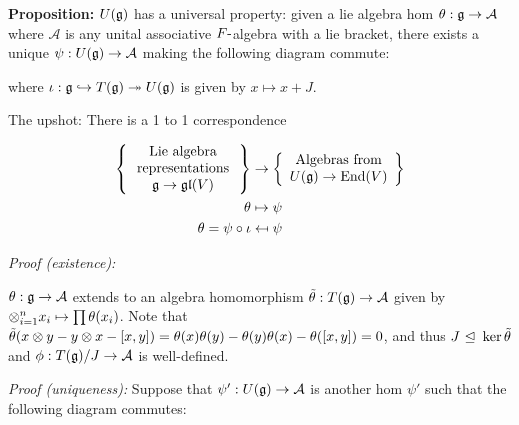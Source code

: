 \textbf{Proposition:} \(U({\mathfrak{g}})\) has a universal property: given a lie
algebra hom \(\theta: {\mathfrak{g}} \to \mathcal A\) where \(\mathcal A\) is any
unital associative \(F{\hbox{-}}\)algebra with a lie bracket, there exists a
unique \(\psi:U({\mathfrak{g}}) \to \mathcal A\) making the following diagram
commute:

\begin{center}
\end{center}

where \(\iota: {\mathfrak{g}} \hookrightarrow T({\mathfrak{g}}) \twoheadrightarrow U({\mathfrak{g}})\) is given by
\(x\mapsto x + J\).

The upshot: There is a 1 to 1 correspondence

\begin{align*}
\left\{ \parbox[c]{1.1in}{\centering
  Lie algebra representations $\lieg \to \liegl(V)$
}\right\}
&\rightarrow
\left\{ \parbox[c]{1.1in}{\centering
  Algebras from $U(\lieg) \to \mathrm{End}(V)$
}\right\} \\
\theta &\mapsto \psi \\
\theta = \psi\circ\iota &\mapsfrom \psi
\end{align*}

\emph{Proof (existence):}

\(\theta: {\mathfrak{g}} \to \mathcal A\) extends to an algebra homomorphism
\(\tilde\theta: T({\mathfrak{g}}) \to \mathcal A\) given by
\(\otimes_{i=1}^n x_i \mapsto \prod \theta(x_i)\). Note that
\(\tilde\theta(x\otimes y - y\otimes x - [x,y]) = \theta(x)\theta(y) - \theta(y)\theta(x) - \theta([x,y]) = 0\),
and thus \(J {~\trianglelefteq~} \ker \tilde\theta\) and
\(\phi: T({\mathfrak{g}})/J \to \mathcal A\) is well-defined.

\emph{Proof (uniqueness):} Suppose that
\(\psi': U({\mathfrak{g}}) \to \mathcal A\) is another hom \(\psi'\) such that
the following diagram commutes:

\begin{center}
\end{center}

